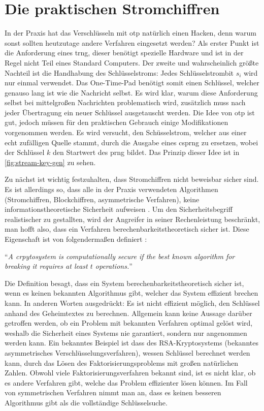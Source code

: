 \section{Die praktischen Stromchiffren}
In der Praxis hat das Verschlüsseln mit \ac{otp} natürlich einen Hacken, denn warum sonst
sollten heutzutage andere Verfahren eingesetzt werden?
Als erster Punkt ist die Anforderung eines \ac{trng}, dieser benötigt spezielle
Hardware und ist in der Regel nicht Teil eines Standard Computers.
Der zweite und wahrscheinlich größte Nachteil ist die Handhabung des Schlüsselstroms:
Jedes Schlüsselstrombit $s_i$ wird nur einmal verwendet.
Das One-Time-Pad benötigt somit einen Schlüssel, welcher genauso lang ist
wie die Nachricht selbst. Es wird klar, warum diese Anforderung
selbst bei mittelgroßen Nachrichten problematisch wird, zusätzlich muss nach jeder
Übertragung ein neuer Schlüssel ausgetauscht werden. Die Idee von \ac{otp} ist gut,
jedoch müssen für den praktischen Gebrauch einige Modifikationen vorgenommen werden.
Es wird versucht, den Schüsselstrom, welcher aus einer echt zufälligen Quelle stammt,
durch die Ausgabe eines \ac{csprng} zu ersetzen, wobei der Schlüssel $k$
den Startwert des \ac{prng} bildet. Das Prinzip dieser Idee ist in
\autoref{fig:stream-key-gen} zu sehen.



\noindent
Zu nächst ist wichtig festzuhalten, dass
Stromchiffren nicht beweisbar sicher sind. Es ist allerdings so, dass alle in der
Praxis verwendeten Algorithmen (Stromchiffren, Blockchiffren, asymmetrische
Verfahren), keine informationstheoretische Sicherheit aufweisen \parencite[38]{BOOK:crypto}.
Um den Sicherheitsbegriff realistischer zu gestallten, wird der Angreifer in seiner
Rechenleistung beschränkt, man hofft also, dass ein Verfahren berechenbarkeitstheoretisch
sicher ist. Diese Eigenschaft ist von \citeauthor{BOOK:crypto}
folgendermaßen definiert \parencite*[35]{BOOK:crypto}:

\begin{definition}
  \enquote{\textit{A crpytosystem is computationally secure if the best
      known algorithm for breaking it requires at least $t$ operations.}}
\end{definition}

\noindent
Die Definition besagt, dass ein System berechenbarkeitstheoretisch sicher ist, wenn es
keinen bekannten Algorithmus gibt, welcher das System effizient brechen kann.
In anderen Worten ausgedrückt: Es ist nicht effizient möglich, den
Schlüssel anhand des Geheimtextes zu berechnen. Allgemein kann keine
Aussage darüber getroffen werden, ob ein Problem mit bekannten Verfahren
optimal gelöst wird, weshalb die Sicherheit eines Systems nie garantiert,
sondern nur angenommen werden kann. Ein bekanntes Beispiel ist dass des RSA-Kryptosystems
(bekanntes asymmetrisches Verschlüsselungsverfahren), wessen Schlüssel
berechnet werden kann, durch das Lösen des Faktorisierungsproblems mit großen
natürlichen Zahlen. Obwohl viele Faktorisierungsverfahren bekannt sind, ist es nicht klar,
ob es andere Verfahren gibt, welche das Problem effizienter lösen können.
Im Fall von symmetrischen Verfahren nimmt man an, dass es keinen besseren Algorithmus
gibt als die vollständige Schlüsselsuche.
